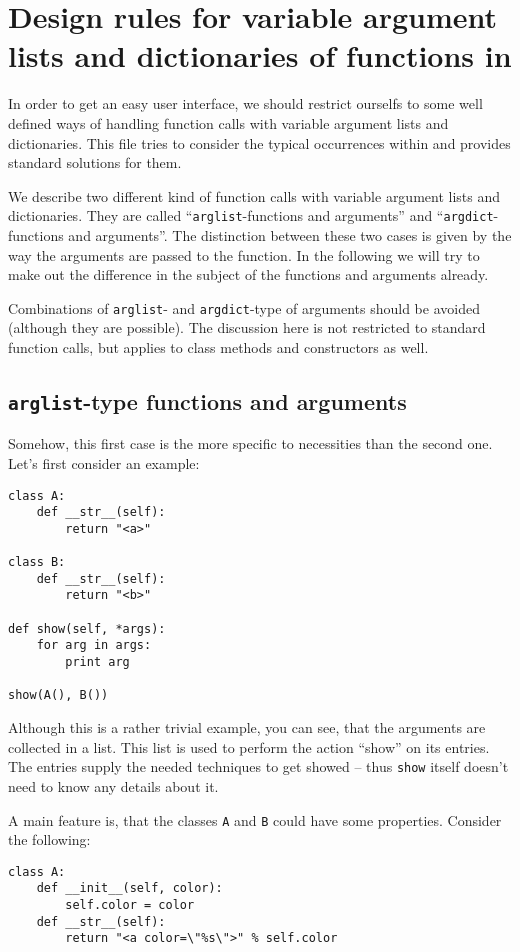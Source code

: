 \documentclass{article}
\begin{document}
\section*{Design rules for variable argument lists and dictionaries
of functions in \PyX}

In order to get an easy user interface, we should restrict ourselfs to
some well defined ways of handling function calls with variable
argument lists and dictionaries. This file tries to consider the
typical occurrences within \PyX{} and provides standard solutions for
them.

We describe two different kind of function calls with variable
argument lists and dictionaries. They are called
``\verb|arglist|-functions and arguments'' and
``\verb|argdict|-functions and arguments''. The distinction between
these two cases is given by the way the arguments are passed to the
function. In the following we will try to make out the difference in
the subject of the functions and arguments already.

Combinations of \verb|arglist|- and \verb|argdict|-type of arguments
should be avoided (although they are possible). The discussion here is
not restricted to standard function calls, but applies to class
methods and constructors as well.

\subsection*{\texttt{arglist}-type functions and arguments}

Somehow, this first case is the more specific to \PyX{} necessities than
the second one. Let's first consider an example:
\begin{verbatim}
class A:
    def __str__(self):
        return "<a>"

class B:
    def __str__(self):
        return "<b>"

def show(self, *args):
    for arg in args:
        print arg

show(A(), B())
\end{verbatim}

Although this is a rather trivial example, you can see, that the
arguments are collected in a list. This list is used to perform the
action ``show'' on its entries. The entries supply the needed
techniques to get showed -- thus \verb|show| itself doesn't need to
know any details about it.

A main feature is, that the classes \verb|A| and \verb|B| could have
some properties. Consider the following:
\begin{verbatim}
class A:
    def __init__(self, color):
        self.color = color
    def __str__(self):
        return "<a color=\"%s\">" % self.color
\end{verbatim}
\end{document}
